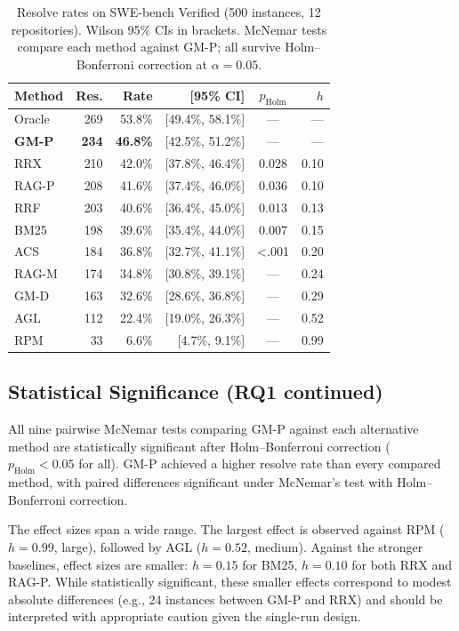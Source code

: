 \begin{table}[t]
\centering
\caption{Resolve rates on SWE-bench Verified (500 instances, 12 repositories). Wilson 95\% CIs in brackets. McNemar tests compare each method against GM-P; all survive Holm--Bonferroni correction at $\alpha=0.05$.}
\label{tab:main_results}
\small
\begin{tabular}{@{}lrrrcr@{}}
\toprule
Method & Res. & Rate & [95\% CI] & $p_\text{Holm}$ & $h$ \\
\midrule
  Oracle & 269 & 53.8\% & [49.4\%, 58.1\%] & --- & --- \\
  \textbf{GM-P} & \textbf{234} & \textbf{46.8\%} & [42.5\%, 51.2\%] & --- & --- \\
  RRX & 210 & 42.0\% & [37.8\%, 46.4\%] & 0.028 & 0.10 \\
  RAG-P & 208 & 41.6\% & [37.4\%, 46.0\%] & 0.036 & 0.10 \\
  RRF & 203 & 40.6\% & [36.4\%, 45.0\%] & 0.013 & 0.13 \\
  BM25 & 198 & 39.6\% & [35.4\%, 44.0\%] & 0.007 & 0.15 \\
  ACS & 184 & 36.8\% & [32.7\%, 41.1\%] & <.001 & 0.20 \\
  RAG-M & 174 & 34.8\% & [30.8\%, 39.1\%] & --- & 0.24 \\
  GM-D & 163 & 32.6\% & [28.6\%, 36.8\%] & --- & 0.29 \\
  AGL & 112 & 22.4\% & [19.0\%, 26.3\%] & --- & 0.52 \\
  RPM & 33 & 6.6\% & [4.7\%, 9.1\%] & --- & 0.99 \\
\bottomrule
\end{tabular}
\end{table}

\subsection{Statistical Significance (RQ1 continued)}

All nine pairwise McNemar tests comparing GM-P against each alternative method are statistically significant after Holm--Bonferroni correction ($p_\text{Holm} < 0.05$ for all). GM-P achieved a higher resolve rate than every compared method, with paired differences significant under McNemar's test with Holm--Bonferroni correction.

The effect sizes span a wide range. The largest effect is observed against RPM ($h = 0.99$, large), followed by AGL ($h = 0.52$, medium). Against the stronger baselines, effect sizes are smaller: $h = 0.15$ for BM25, $h = 0.10$ for both RRX and RAG-P. While statistically significant, these smaller effects correspond to modest absolute differences (e.g., 24 instances between GM-P and RRX) and should be interpreted with appropriate caution given the single-run design.

